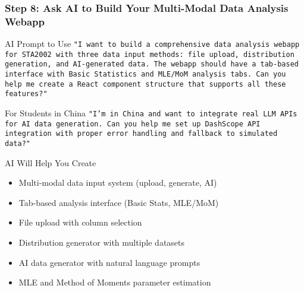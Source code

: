\documentclass[aspectratio=169]{beamer}
\begin{document}
\begin{frame}
\frametitle{Step 8: Ask AI to Build Your Multi-Modal Data Analysis Webapp}
\begin{alertblock}{AI Prompt to Use}
\texttt{"I want to build a comprehensive data analysis webapp for STA2002 with three data input methods: file upload, distribution generation, and AI-generated data. The webapp should have a tab-based interface with Basic Statistics and MLE/MoM analysis tabs. Can you help me create a React component structure that supports all these features?"}
\end{alertblock}

\begin{alertblock}{For Students in China}
\texttt{"I'm in China and want to integrate real LLM APIs for AI data generation. Can you help me set up DashScope API integration with proper error handling and fallback to simulated data?"}
\end{alertblock}

\begin{exampleblock}{AI Will Help You Create}
\begin{itemize}
\item Multi-modal data input system (upload, generate, AI)
\item Tab-based analysis interface (Basic Stats, MLE/MoM)
\item File upload with column selection
\item Distribution generator with multiple datasets
\item AI data generator with natural language prompts
\item MLE and Method of Moments parameter estimation
\end{itemize}
\end{exampleblock}
\end{frame}
\end{document}
